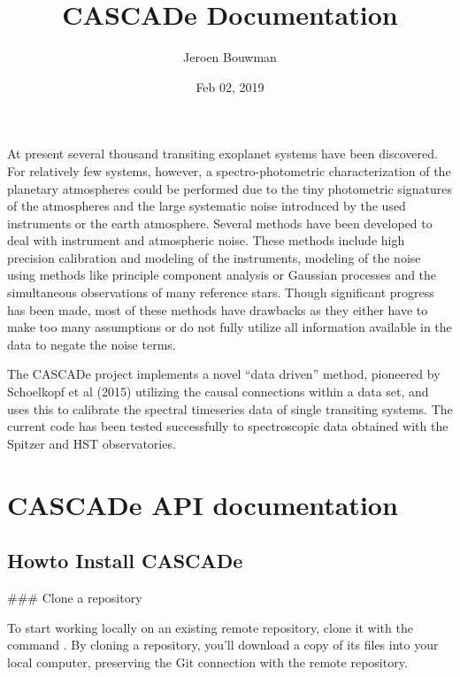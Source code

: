 \documentclass[a4paper,11pt,english]{sphinxmanual}
\title{CASCADe Documentation}
\date{Feb 02, 2019}
\author{Jeroen Bouwman}
\begin{document}
\pagestyle{empty}
\maketitle
\pagestyle{plain}
\sphinxtableofcontents
\pagestyle{normal}
\label{\detokenize{index::doc}}


At present several thousand transiting exoplanet systems have been discovered.
For relatively few systems, however, a spectro-photometric characterization of
the planetary atmospheres could be performed due to the tiny photometric signatures
of the atmospheres and the large systematic noise introduced by the used instruments
or the earth atmosphere. Several methods have been developed to deal with instrument
and atmospheric noise. These methods include high precision calibration and modeling
of the instruments, modeling of the noise using methods like principle component
analysis or Gaussian processes and the simultaneous observations of many reference
stars. Though significant progress has been made, most of these methods have drawbacks
as they either have to make too many assumptions or do not fully utilize all
information available in the data to negate the noise terms.

The CASCADe project implements a novel “data driven” method, pioneered by
Schoelkopf et al (2015) utilizing the causal connections within a data set,
and uses this to calibrate the spectral timeseries data of single transiting
systems. The current code has been tested successfully to spectroscopic data
obtained with the Spitzer and HST observatories.


\chapter{CASCADe API documentation}
\label{\detokenize{index:cascade-api-documentation}}

\section{Howto Install CASCADe}
\label{\detokenize{install:howto-install-cascade}}\label{\detokenize{install::doc}}
\#\#\# Clone a repository

To start working locally on an existing remote repository,
clone it with the command .
By cloning a repository, you’ll download a copy of its
files into your local computer, preserving the Git
connection with the remote repository.
\end{document}
